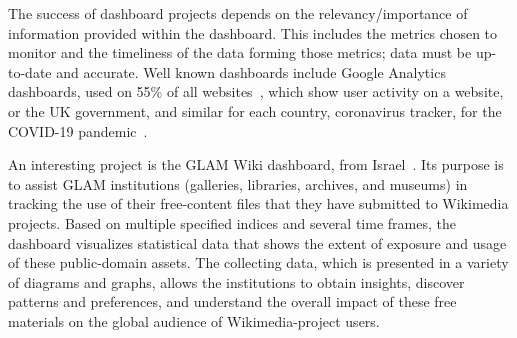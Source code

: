 The success of dashboard projects depends on the relevancy/importance of information provided within the dashboard. This includes the metrics chosen to monitor and the timeliness of the data forming those metrics; data must be up-to-date and accurate.
Well known dashboards include Google Analytics dashboards, used on 55\% of all websites~\cite{Misch:w3techs_usage}, which show user activity on a website, or the UK government, and similar for each country, coronavirus tracker, for the COVID-19 pandemic~\cite{Misc:uk_covid_dash}.

An interesting project is the GLAM Wiki dashboard, from Israel~\cite{Misc:wikidata_glam_project}.
Its purpose is to assist GLAM institutions (galleries, libraries, archives, and museums) in tracking the use of their free-content files that they have submitted to Wikimedia projects.
Based on multiple specified indices and several time frames, the dashboard visualizes statistical data that shows the extent of exposure and usage of these public-domain assets.
The collecting data, which is presented in a variety of diagrams and graphs, allows the institutions to obtain insights, discover patterns and preferences, and understand the overall impact of these free materials on the global audience of Wikimedia-project users.

